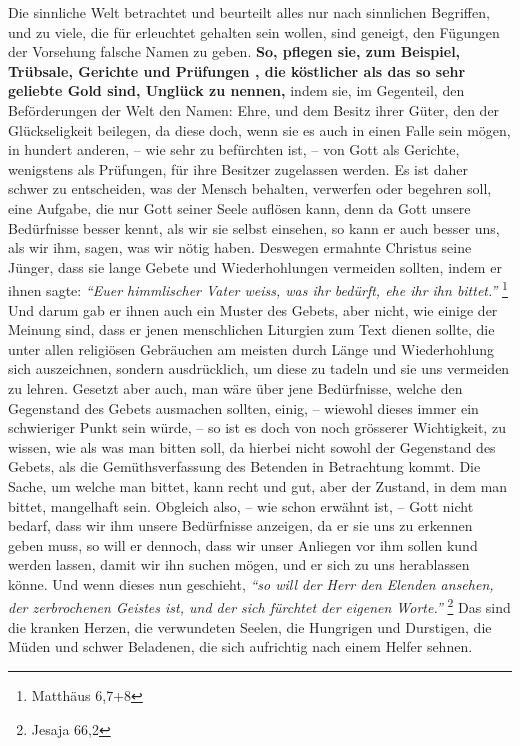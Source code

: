 \medskip

\label{ref:06_13_auf_die_probe_gestellt}
Die sinnliche Welt betrachtet und beurteilt alles nur nach sinnlichen
Begriffen, und zu viele, die für erleuchtet 
gehalten sein wollen, sind
geneigt, den Fügungen der Vorsehung falsche Namen zu geben.
\textbf{So, pflegen
sie, zum
Beispiel, Trübsale, Gerichte und Prüfungen , die köstlicher
als das so sehr
geliebte Gold sind, Unglück  zu nennen,} indem sie, im
Gegenteil, den
Beförderungen der Welt den Namen: Ehre, und dem Besitz ihrer Güter, den der
Glückseligkeit  beilegen, da diese doch, wenn sie es auch
in einen Falle sein
mögen, in hundert anderen, -- wie sehr zu befürchten ist, -- von Gott als
Gerichte, wenigstens als Prüfungen, für ihre Besitzer zugelassen
werden. Es ist
daher schwer zu entscheiden, was der Mensch behalten, verwerfen oder begehren
soll, eine Aufgabe, die nur Gott seiner Seele auflösen
kann, denn da Gott unsere
Bedürfnisse  besser kennt, als wir sie
selbst einsehen, so kann er auch besser
uns, als wir ihm, sagen, was wir nötig haben. Deswegen ermahnte Christus seine
Jünger, dass sie lange Gebete und Wiederhohlungen vermeiden sollten, indem er
ihnen sagte:
\textit{"`Euer himmlischer Vater weiss, was ihr bedürft, ehe ihr ihn
bittet."'}
\footnote{Matthäus 6,7+8}
Und darum gab er ihnen auch ein Muster des
Gebets, aber nicht, wie einige der Meinung sind, dass er jenen menschlichen
Liturgien zum Text dienen sollte, die unter allen religiösen Gebräuchen am
meisten durch Länge und Wiederhohlung sich auszeichnen, sondern ausdrücklich,
um diese zu tadeln und sie uns vermeiden zu lehren. Gesetzt aber auch, man wäre
über jene Bedürfnisse, welche den Gegenstand des Gebets ausmachen sollten,
einig, -- wiewohl dieses immer ein schwieriger Punkt sein würde, -- so ist es
doch von noch grösserer Wichtigkeit, zu wissen, wie als was man bitten soll, da
hierbei nicht sowohl der Gegenstand des Gebets, als die Gemüthsverfassung des
Betenden in Betrachtung kommt. Die Sache, um welche man bittet, kann recht und
gut, aber der Zustand, in dem man bittet, mangelhaft sein. Obgleich also, -- wie
schon erwähnt ist, -- Gott nicht bedarf, dass wir ihm unsere Bedürfnisse
anzeigen, da er sie uns zu erkennen geben muss, so will er dennoch, dass wir
unser Anliegen vor ihm sollen kund werden lassen, damit wir ihn suchen mögen,
und er sich zu uns herablassen könne. Und wenn dieses nun geschieht,
\textit{"`so will der Herr den Elenden ansehen, der zerbrochenen Geistes ist,
und der sich fürchtet der eigenen Worte."'}
\footnote{Jesaja 66,2}
Das sind die kranken Herzen, die
verwundeten Seelen, die Hungrigen und Durstigen, die Müden
und schwer Beladenen,
die sich aufrichtig nach einem Helfer sehnen.

